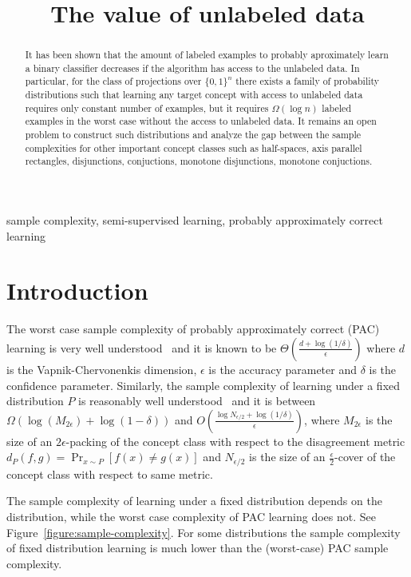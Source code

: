 \documentclass[12pt]{colt2019}
\title{The value of unlabeled data}
\begin{document}
\maketitle

\begin{abstract}
It has been shown that the amount of labeled examples to probably aproximately
learn a binary classifier decreases if the algorithm has access to the unlabeled
data. In particular, for the class of projections over $\{0,1\}^n$ there exists
a family of probability distributions such that learning any target concept with
access to unlabeled data requires only constant number of examples, but it
requires $\Omega(\log n)$ labeled examples in the worst case without the access
to unlabeled data. It remains an open problem to construct such distributions
and analyze the gap between the sample complexities for other important concept
classes such as half-spaces, axis parallel rectangles, disjunctions,
conjuctions, monotone disjunctions, monotone conjuctions.
\end{abstract}

\begin{keywords}
sample complexity, semi-supervised learning, probably approximately correct
learning
\end{keywords}

\section{Introduction}

The worst case sample complexity of probably approximately correct (PAC)
learning is very well understood~\citep{Hanneke-2016} and it is known to be
$\Theta \left(\frac{d + \log(1/\delta)}{\epsilon}\right)$ where $d$ is the
Vapnik-Chervonenkis dimension, $\epsilon$ is the accuracy parameter and $\delta$
is the confidence parameter. Similarly, the sample complexity of learning under
a fixed distribution $P$ is reasonably well understood~\citep{Benedek-Itai-1991}
and it is between $\Omega(\log(M_{2\epsilon}) + \log(1-\delta))$ and $O
\left(\frac{\log N_{\epsilon/2} + \log(1/\delta)}{\epsilon} \right)$, where
$M_{2\epsilon}$ is the size of an $2\epsilon$-packing of the concept class with
respect to the disagreement metric $d_P(f,g) = \Pr_{x \sim P}[f(x) \neq g(x)]$
and $N_{\epsilon/2}$ is the size of an $\frac{\epsilon}{2}$-cover of the concept
class with respect to same metric.

The sample complexity of learning under a fixed distribution depends on the
distribution, while the worst case complexity of PAC learning does not. See
Figure~\ref{figure:sample-complexity}. For some distributions the sample
complexity of fixed distribution learning is much lower than the (worst-case)
PAC sample complexity.
\end{document}
